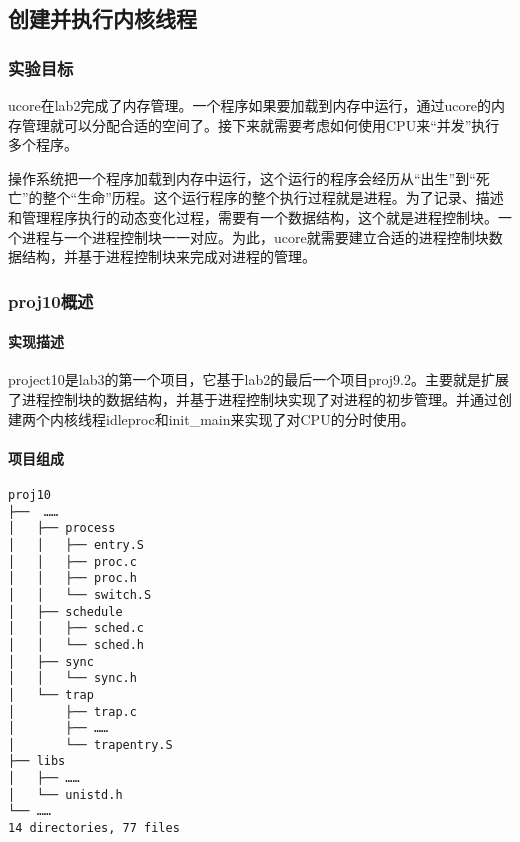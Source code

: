 \subsection{创建并执行内核线程}\label{ux521bux5efaux5e76ux6267ux884cux5185ux6838ux7ebfux7a0b}

\subsubsection{实验目标}\label{ux5b9eux9a8cux76eeux6807}

ucore在lab2完成了内存管理。一个程序如果要加载到内存中运行，通过ucore的内存管理就可以分配合适的空间了。接下来就需要考虑如何使用CPU来``并发''执行多个程序。

操作系统把一个程序加载到内存中运行，这个运行的程序会经历从``出生''到``死亡''的整个``生命''历程。这个运行程序的整个执行过程就是进程。为了记录、描述和管理程序执行的动态变化过程，需要有一个数据结构，这个就是进程控制块。一个进程与一个进程控制块一一对应。为此，ucore就需要建立合适的进程控制块数据结构，并基于进程控制块来完成对进程的管理。

\subsubsection{proj10概述}\label{proj10ux6982ux8ff0}

\paragraph{实现描述}\label{ux5b9eux73b0ux63cfux8ff0}

project10是lab3的第一个项目，它基于lab2的最后一个项目proj9.2。主要就是扩展了进程控制块的数据结构，并基于进程控制块实现了对进程的初步管理。并通过创建两个内核线程idleproc和init\_main来实现了对CPU的分时使用。

\paragraph{项目组成}\label{ux9879ux76eeux7ec4ux6210}

\begin{lstlisting}
proj10
├──  ……
│   ├── process
│   │   ├── entry.S
│   │   ├── proc.c
│   │   ├── proc.h
│   │   └── switch.S
│   ├── schedule
│   │   ├── sched.c
│   │   └── sched.h
│   ├── sync
│   │   └── sync.h
│   └── trap
│       ├── trap.c
│       ├── ……
│       └── trapentry.S
├── libs
│   ├── ……
│   └── unistd.h
└── ……
14 directories, 77 files
\end{lstlisting}

